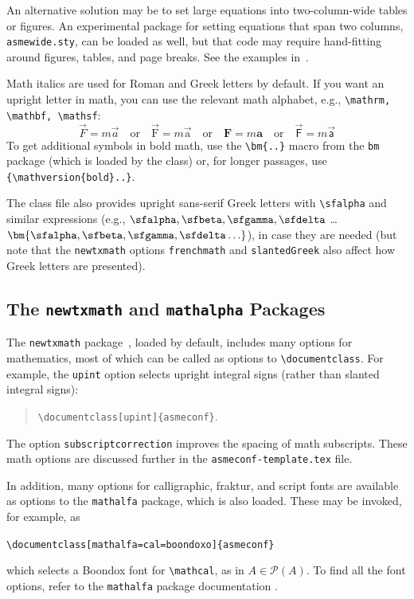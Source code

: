 \documentclass[captionpatch,colorlinks,upint,subscriptcorrection,varvw,german]{asmeconf}
\begin{document}
An alternative solution may be to set large equations into two-column-wide tables or figures. An experimental package for setting equations that span two columns, \texttt{asmewide.sty}, can be loaded as well, but that code may require hand-fitting around figures, tables, and page breaks. See the examples in~\cite{lienhard2022}.

Math italics are used for Roman and Greek letters by default.  If you want an upright letter in math, you can use the relevant math alphabet, e.g., \verb|\mathrm, \mathbf, \mathsf|:
\begin{equation}\label{eqn:dw}
\vec{F} = m \vec{a} \quad\textrm{or}\quad \vec{\mathrm{F}} = m \vec{\mathrm{a}} \quad\textrm{or}\quad \mathbf{F} = m \mathbf{a} \quad\textrm{or}\quad \vec{\mathsf{F}} = m \vec{\mathsf{a}}
\end{equation}
To get additional symbols in bold math, use the \verb|\bm{..}| macro from the \texttt{bm} package (which is loaded by the class) or, for longer passages, use \verb|{\mathversion{bold}..|\texttt{\}}.

The class file also provides upright sans-serif Greek letters with \verb|\sfalpha| and similar expressions (e.g., $\sfalpha, \sfbeta, \sfgamma, \sfdelta$ \ldots $\bm{\sfalpha, \sfbeta, \sfgamma, \sfdelta \ldots}$), in case they are needed (but note that the \verb|newtxmath| options \verb|frenchmath| and \verb|slantedGreek| also affect how Greek letters are presented).

\subsection{The \texttt{newtxmath} and \texttt{mathalpha} Packages~\cite{sharpe1,sharpe2}} The \texttt{newtxmath} package~\cite{sharpe1}, loaded by default, includes many options for mathematics, most of which can be called as options to \verb|\documentclass|. For example, the \texttt{upint} option selects upright integral signs (rather than slanted integral signs):
\begin{quote}
\verb|\documentclass[upint]{asmeconf}|. 
\end{quote}  
The option \verb|subscriptcorrection| improves the spacing of math subscripts. These math options are discussed further in the \texttt{asmeconf-template.tex} file. 

In addition, many options for calligraphic, fraktur, and script fonts are available as options to the \texttt{mathalfa} package, which is also loaded. These may be invoked, for example, as 
\begin{center}
\verb|\documentclass[mathalfa=cal=boondoxo]{asmeconf}| 
\end{center}
which selects a Boondox font for \verb|\mathcal|, as in $A \in \mathcal{P}(A)$. To find all the font options, refer to the \texttt{mathalfa} package documentation \cite{sharpe2}.
\end{document}
